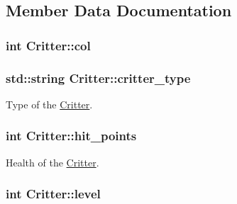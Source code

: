 \subsection{Member Data Documentation}
\hypertarget{class_critter_a22fc3dd912a58aafc3aa7f118f1f2440}{
\subsubsection[{col}]{\setlength{\rightskip}{0pt plus 5cm}int Critter\+::col}}\label{class_critter_a22fc3dd912a58aafc3aa7f118f1f2440}
\hypertarget{class_critter_a0228568729f86823591b390f53ad5ebc}{
\subsubsection[{critter\+\_\+type}]{\setlength{\rightskip}{0pt plus 5cm}std\+::string Critter\+::critter\+\_\+type\hspace{0.3cm}{\ttfamily [protected]}}}\label{class_critter_a0228568729f86823591b390f53ad5ebc}


Type of the \hyperlink{class_critter}{Critter}. 

\hypertarget{class_critter_a916038a11e8443ea403a644e91fc791e}{
\subsubsection[{hit\+\_\+points}]{\setlength{\rightskip}{0pt plus 5cm}int Critter\+::hit\+\_\+points\hspace{0.3cm}{\ttfamily [protected]}}}\label{class_critter_a916038a11e8443ea403a644e91fc791e}


Health of the \hyperlink{class_critter}{Critter}. 

\hypertarget{class_critter_a9f9a6408a55212036f317710dc3da410}{
\subsubsection[{level}]{\setlength{\rightskip}{0pt plus 5cm}int Critter\+::level\hspace{0.3cm}{\ttfamily [protected]}}}\label{class_critter_a9f9a6408a55212036f317710dc3da410}


